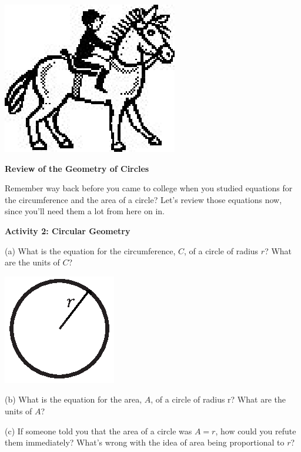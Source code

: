\vspace{0.3cm}
{\par\raggedright \includegraphics{rotation/rotation_fig3.eps} \par}
\vspace{0.3cm}

\textbf{Review of the Geometry of Circles }

Remember way back before you came to college when you studied equations for
the circumference and the area of a circle? Let's review those equations now,
since you'll need them a lot from here on in.

\textbf{Activity 2: Circular Geometry} 

(a) What is the equation for the circumference, $C$, of a circle of radius $r$?
What are the units of $C$?

\vspace{0.3cm}
{\par\raggedright \includegraphics{rotation/just_a_circle.eps} \par}
\vspace{0.3cm}

(b) What is the equation for the area, $A$, of a circle of radius r? What are
the units of $A$?
\vspace{10mm}

(c) If someone told you that the area of a circle was $A = r$, how could you refute
them immediately? What's wrong with the idea of area being proportional to $r$?
\vspace{20mm}

